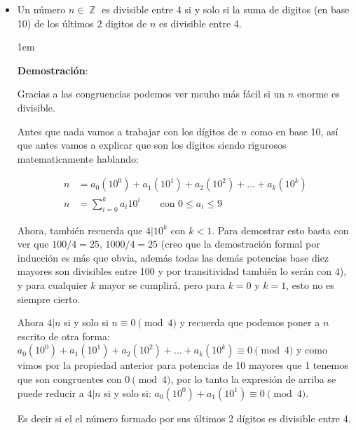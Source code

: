 \documentclass[12pt, fleqn]{article}                             %
\newenvironment{SmallIndentation}[1][0.75em]                    %
    {\begin{adjustwidth}{#1}{}\begin{footnotesize}}                 %
    {\end{footnotesize}\end{adjustwidth}}                           %
\DeclareMathOperator \Space {\quad}                             %
\DeclareMathOperator \Integers  {\mathbb{Z}}                     %
\begin{document}
\begin{itemize}
\begin{SmallIndentation}[1em]
                Finalmente podemos concluir que $12 | 2p + 2$

            \end{SmallIndentation}

        \clearpage

        \item

            Un número $n \in \Integers$ es divisible entre 4 si y solo si
            la suma de digitos (en base 10) de los últimos 2 digitos de $n$ es divisible
            entre 4.

            \begin{SmallIndentation}[1em]
                \textbf{Demostración}:

                Gracias a las congruencias podemos ver mcuho más fácil si un $n$ enorme
                es divisible.

                Antes que nada vamos a trabajar con los dígitos de $n$ como en base 10,
                así que antes vamos a explicar que son los dígitos siendo rigurosos matematicamente
                hablando:

                \begin{equation}
                \begin{split}
                    n &= a_0(10^0) + a_1(10^1) + a_2(10^2) + \dots + a_k(10^k)          \\
                    n &= \sum_{i=0}^{k} a_i 10^i \Space \text{ con } 0 \leq a_i \leq 9
                \end{split}
                \end{equation}

                Ahora, también recuerda que $4 |10^k$ con $k<1$.
                Para demostrar esto basta con ver que $100/4 = 25$, 
                $1000/4 = 25$ (creo que la demostración formal por inducción
                es más que obvia, además todas las demás potencias base diez mayores son
                divisibles entre 100 y por transitividad también lo serán con $4$), y para
                cualquier $k$ mayor se cumplirá, pero para $k=0$ y $k=1$, esto no es siempre cierto.

                Ahora $4|n$ si y solo si $n \equiv 0 \pmod{4}$ y recuerda
                que podemos poner a $n$ escrito de otra forma:
                $a_0(10^0) + a_1(10^1) + a_2(10^2) + \dots + a_k(10^k) \equiv 0 \pmod{4}$
                y como vimos por la propiedad anterior para potencias de 10 mayores que
                1 tenemos que son congruentes con $0 \pmod{4}$, por lo tanto la
                expresión de arriba se puede reducir a $4|n$ si y solo si: 
                $a_0(10^0) + a_1(10^1) \equiv 0 \pmod{4}$.

                Es decir si el el número formado por sus últimos 2 dígitos es divisible
                entre 4.

            \end{SmallIndentation}


    \end{itemize}

            
\end{document}
